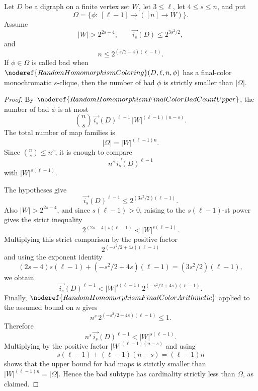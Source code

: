 \begin{helper}
Let \(D\) be a digraph on a finite vertex set \(W\), let \(3\le\ell\), let
\(4\le s\le n\), and put
\[
  \Omega=\{\phi:\ [\ell-1]\to([n]\to W)\}.
\]
Assume
\[
  |W|>2^{2s-4},\qquad
  \overrightarrow{i_s}(D)\le 2^{3s^2/2},
\]
and
\[
  n\le 2^{(s/2-4)(\ell-1)}.
\]
If \(\phi\in\Omega\) is called bad when
\(\noderef{RandomHomomorphismColoring}(D,\ell,n,\phi)\) has a final-color
monochromatic \(s\)-clique, then the number of bad \(\phi\) is strictly smaller
than \(|\Omega|\).
\end{helper}
\begin{proof}
By \(\noderef{RandomHomomorphismFinalColorBadCountUpper}\), the number of bad
\(\phi\) is at most
\[
  \binom ns\,\overrightarrow{i_s}(D)^{\ell-1}\,
  |W|^{(\ell-1)(n-s)}.
\]
The total number of map families is
\[
  |\Omega|=|W|^{(\ell-1)n}.
\]
Since \(\binom ns\le n^s\), it is enough to compare
\[
  n^s\,\overrightarrow{i_s}(D)^{\ell-1}
\]
with \(|W|^{s(\ell-1)}\).

The hypotheses give
\[
  \overrightarrow{i_s}(D)^{\ell-1}
  \le 2^{(3s^2/2)(\ell-1)}.
\]
Also \(|W|>2^{2s-4}\), and since \(s(\ell-1)>0\), raising to the
\(s(\ell-1)\)-st power gives the strict inequality
\[
  2^{(2s-4)s(\ell-1)}<|W|^{s(\ell-1)}.
\]
Multiplying this strict comparison by the positive factor
\[
  2^{(-s^2/2+4s)(\ell-1)}
\]
and using the exponent identity
\[
  (2s-4)s(\ell-1)+(-s^2/2+4s)(\ell-1)
  =(3s^2/2)(\ell-1),
\]
we obtain
\[
  \overrightarrow{i_s}(D)^{\ell-1}
  < |W|^{s(\ell-1)}\,2^{(-s^2/2+4s)(\ell-1)}.
\]
Finally, \(\noderef{RandomHomomorphismFinalColorArithmetic}\) applied to the
assumed bound on \(n\) gives
\[
  n^s\,2^{(-s^2/2+4s)(\ell-1)}\le 1.
\]
Therefore
\[
  n^s\,\overrightarrow{i_s}(D)^{\ell-1}<|W|^{s(\ell-1)}.
\]
Multiplying by the positive factor \(|W|^{(\ell-1)(n-s)}\) and using
\[
  s(\ell-1)+(\ell-1)(n-s)=(\ell-1)n
\]
shows that the upper bound for bad maps is strictly smaller than
\(|W|^{(\ell-1)n}=|\Omega|\).  Hence the bad subtype has cardinality strictly
less than \(\Omega\), as claimed.
\end{proof}

